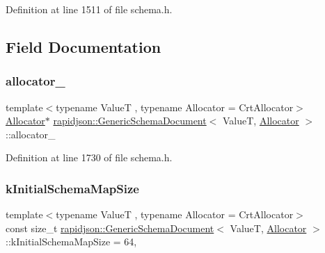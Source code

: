 Definition at line 1511 of file schema.\+h.



\subsection{Field Documentation}
\mbox{\label{classrapidjson_1_1_generic_schema_document_a2e08550dc68553144a6d8d1cdde89011}} 
\subsubsection{\texorpdfstring{allocator\_}{allocator\_}}
{\footnotesize\ttfamily template$<$typename ValueT , typename Allocator  = Crt\+Allocator$>$ \\
\mbox{\hyperlink{classrapidjson_1_1_allocator}{Allocator}}$\ast$ \mbox{\hyperlink{classrapidjson_1_1_generic_schema_document}{rapidjson\+::\+Generic\+Schema\+Document}}$<$ ValueT, \mbox{\hyperlink{classrapidjson_1_1_allocator}{Allocator}} $>$\+::allocator\+\_\+\hspace{0.3cm}{\ttfamily [private]}}



Definition at line 1730 of file schema.\+h.

\mbox{\label{classrapidjson_1_1_generic_schema_document_a5557711a06945d5fa29cd89104fef97c}} 
\subsubsection{\texorpdfstring{kInitialSchemaMapSize}{kInitialSchemaMapSize}}
{\footnotesize\ttfamily template$<$typename ValueT , typename Allocator  = Crt\+Allocator$>$ \\
const size\+\_\+t \mbox{\hyperlink{classrapidjson_1_1_generic_schema_document}{rapidjson\+::\+Generic\+Schema\+Document}}$<$ ValueT, \mbox{\hyperlink{classrapidjson_1_1_allocator}{Allocator}} $>$\+::k\+Initial\+Schema\+Map\+Size = 64\hspace{0.3cm}{\ttfamily [static]}, {\ttfamily [private]}}



